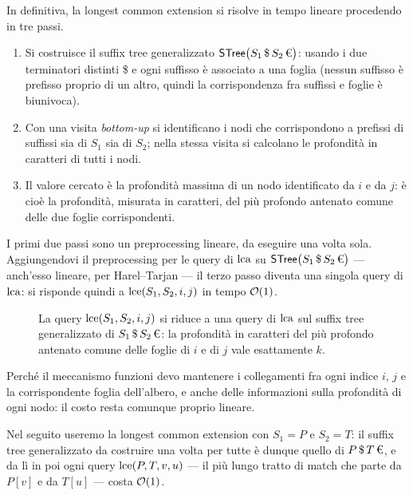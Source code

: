 In definitiva, la longest common extension si risolve in tempo lineare
procedendo in tre passi.

\begin{enumerate}
  \item Si costruisce il suffix tree generalizzato
        $\STree\bigl(S_1\,\text{\$}\,S_2\,\text{\texteuro}\bigr)$: usando i due
        terminatori distinti \$ e \texteuro{} ogni suffisso è associato a una
        foglia (nessun suffisso è prefisso proprio di un altro, quindi la
        corrispondenza fra suffissi e foglie è biunivoca).
  \item Con una visita \emph{bottom-up} si identificano i nodi che corrispondono
        a prefissi di suffissi sia di $S_1$ sia di $S_2$; nella stessa visita si
        calcolano le profondità in caratteri di tutti i nodi.
  \item Il valore cercato è la profondità massima di un nodo identificato da $i$
        e da $j$: è cioè la profondità, misurata in caratteri, del più profondo
        antenato comune delle due foglie corrispondenti.
\end{enumerate}

\begin{osservazione}
  I primi due passi sono un preprocessing lineare, da eseguire una volta sola.
  Aggiungendovi il preprocessing per le query di $\operatorname{lca}$ su
  $\STree\bigl(S_1\,\text{\$}\,S_2\,\text{\texteuro}\bigr)$ --- anch'esso
  lineare, per Harel--Tarjan --- il terzo passo diventa una singola query di
  $\operatorname{lca}$: si risponde quindi a $\operatorname{lce}(S_1,S_2,i,j)$ in tempo $\mathcal{O}(1)$.
\end{osservazione}

\begin{figure}[H]
  \centering
  
  \caption{La query $\operatorname{lce}(S_1,S_2,i,j)$ si riduce a una query di $\operatorname{lca}$ sul
  suffix tree generalizzato di $S_1\,\text{\$}\,S_2\,\text{\texteuro}$: la
  profondità in caratteri del più profondo antenato comune delle foglie di $i$ e
  di $j$ vale esattamente $k$.}
  \label{fig:lce-lca}
\end{figure}

\begin{osservazione}
  Perché il meccanismo funzioni devo mantenere i collegamenti fra ogni indice
  $i$, $j$ e la corrispondente foglia dell'albero, e anche delle informazioni
  sulla profondità di ogni nodo: il costo resta comunque proprio lineare.
\end{osservazione}

Nel seguito useremo la longest common extension con $S_1=P$ e $S_2=T$: il
suffix tree generalizzato da costruire una volta per tutte è dunque quello di
$P\,\text{\$}\,T\,\text{\texteuro}$, e da lì in poi ogni query
$\operatorname{lce}(P,T,v,u)$ --- il più lungo tratto di match che parte da $P[v]$ e da
$T[u]$ --- costa $\mathcal{O}(1)$.

